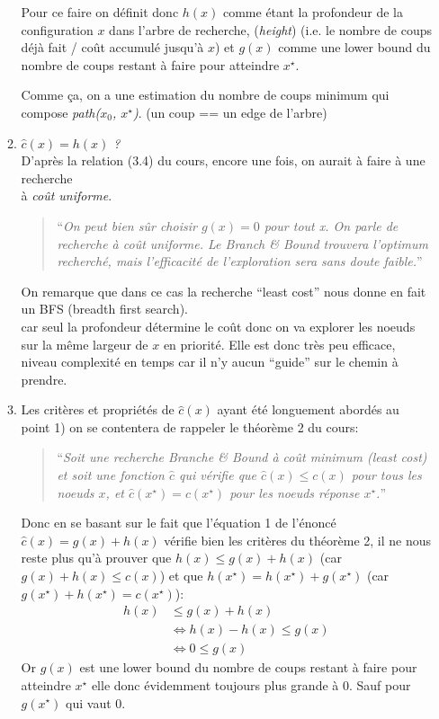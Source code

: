 \documentclass[french]{article}
\newcommand{\quo}[1]{``{#1}''}
\newcommand{\xsol}{x^{\star}}
\begin{document}
\begin{enumerate}[label=(\alph*)]
\begin{enumerate}[label=\arabic*)]
	Pour ce faire on définit donc $h(x)$ comme étant la profondeur de la configuration $x$ dans l'arbre de recherche, (\textit{height})
	(i.e. le nombre de coups déjà fait / coût accumulé jusqu'à $x$) et $g(x)$ comme une lower bound du nombre de coups restant à faire pour atteindre $\xsol$.
	
	Comme ça, on a une estimation du nombre de coups minimum qui compose \textit{path($x_0$, $\xsol$)}. (un coup == un edge de l'arbre)\\
	
	\item \textit{$\hat{c}(x) = h(x)$ ?}\\
	D'après la relation (3.4) du cours, encore une fois, on aurait à faire à une recherche\\ à \textit{coût uniforme}.
	\begin{quote}
		\quo{\textit{On peut bien sûr choisir $g(x) = 0$ pour tout x. On parle de recherche à coût uniforme. Le Branch \& Bound trouvera
		l'optimum recherché, mais l'efficacité de l'exploration sera sans doute faible.}}
	\end{quote}
	On remarque que dans ce cas la recherche \quo{least cost} nous donne en fait un BFS (breadth first search).\\
	car seul la profondeur détermine le coût donc on va explorer les noeuds sur la même largeur de $x$ en priorité.
	Elle est donc très peu efficace, niveau complexité en temps car il n'y aucun \quo{guide} sur le chemin à prendre.\\

	\item Les critères et propriétés de \(\hat{c}(x)\) ayant été longuement abordés au point 1) on se contentera de rappeler le théorème 2 du cours:
	\begin{quote}
		\quo{\textit{Soit une recherche Branche \& Bound à coût minimum (least cost) 
		et soit une fonction \(\hat{c}\) qui vérifie que \(\hat{c}(x) \leq c(x) \) pour tous les noeuds $x$, 
		et \(\hat{c}(\xsol) = c(\xsol) \) pour les noeuds réponse $\xsol$.}}
	\end{quote}
	Donc en se basant sur le fait que l'équation 1 de l'énoncé $\hat{c}(x) = g(x) + h(x)$ vérifie bien les critères du théorème 2,
	il ne nous reste plus qu'à prouver que \(h(x) \leq g(x) + h(x) \) (car \(g(x) + h(x) \leq c(x) \)) et que \(h(\xsol) = h(\xsol) + g(\xsol)\) (car \(g(\xsol) + h(\xsol) = c(\xsol) \)):
	\begin{align*}
		h(x) &\leq g(x) + h(x)\\
		&\Longleftrightarrow h(x) - h(x) \leq g(x)\\
		&\Longleftrightarrow 0 \leq g(x)
	\end{align*} 
	Or $g(x)$ est une lower bound du nombre de coups restant à faire pour atteindre $\xsol$ elle donc évidemment toujours plus grande à 0. Sauf pour $g(\xsol)$ qui vaut 0.
	

\end{enumerate}
\end{enumerate}
\end{document}
